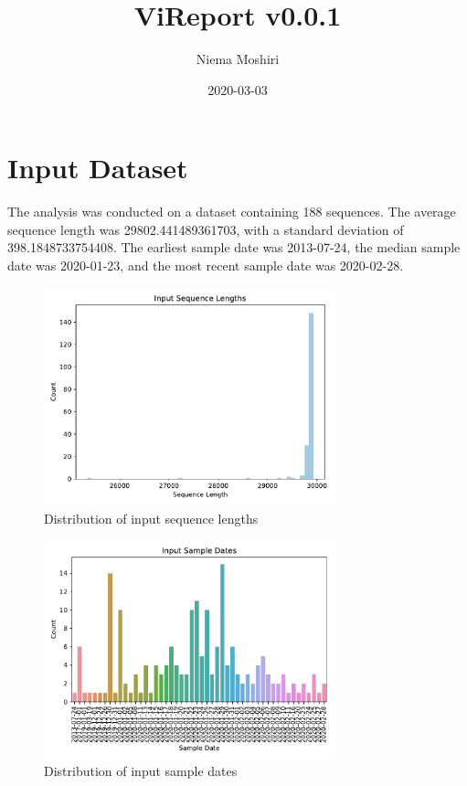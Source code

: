 \documentclass{article}
\title{\vspace{-2.0cm}ViReport v0.0.1}
\author{Niema Moshiri}
\date{2020-03-03}
\begin{document}
\maketitle

\section{Input Dataset}
The analysis was conducted on a dataset containing 188 sequences.
The average sequence length was 29802.441489361703,
with a standard deviation of 398.1848733754408.
The earliest sample date was 2013-07-24,
the median sample date was 2020-01-23,
and the most recent sample date was 2020-02-28.


\begin{figure}[h]
\centering
\includegraphics[width=0.75\textwidth]{./figs/input_sequence_lengths.pdf}
\caption{Distribution of input sequence lengths}
\end{figure}



\begin{figure}[h]
\centering
\includegraphics[width=0.75\textwidth]{./figs/input_sample_dates.pdf}
\caption{Distribution of input sample dates}
\end{figure}
\end{document}
